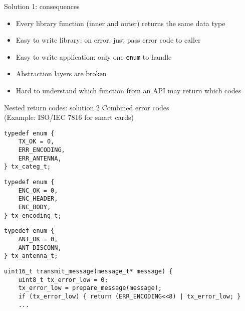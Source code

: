 \documentclass[aspectratio=169,14pt]{beamer}
\begin{document}
\begin{frame}{Solution 1: consequences}
\begin{itemize}
    \item[\good] Every library function (inner and outer) returns the same data type
    \item[\good] Easy to write library: on error, just pass error code to caller
    \item[\good] Easy to write application: only one \texttt{enum} to handle
    \item[\bad] Abstraction layers are broken
    \item[\bad] Hard to understand which function from an API may return which codes
\end{itemize}
\end{frame}




\begin{frame}[fragile]{Nested return codes: solution 2}
Combined error codes\\
(Example: ISO/IEC 7816 for smart cards)

\begin{minipage}[t]{0.3\textwidth}
\begin{lstlisting}[style=cstyle]
typedef enum {
    TX_OK = 0,
    ERR_ENCODING,
    ERR_ANTENNA,
} tx_categ_t;
\end{lstlisting}
\end{minipage}
\begin{minipage}[t]{0.3\textwidth}
\begin{lstlisting}[style=cstyle]
typedef enum {
    ENC_OK = 0,
    ENC_HEADER,
    ENC_BODY,
} tx_encoding_t;
\end{lstlisting}
\end{minipage}
\begin{minipage}[t]{0.3\textwidth}
\begin{lstlisting}[style=cstyle]
typedef enum {
    ANT_OK = 0,
    ANT_DISCONN,
} tx_antenna_t;
\end{lstlisting}
\end{minipage}

\begin{lstlisting}[style=cstyle]
uint16_t transmit_message(message_t* message) {
    uint8_t tx_error_low = 0;
    tx_error_low = prepare_message(message);
    if (tx_error_low) { return (ERR_ENCODING<<8) | tx_error_low; }
    ...
\end{lstlisting}
\end{frame}
\end{document}
